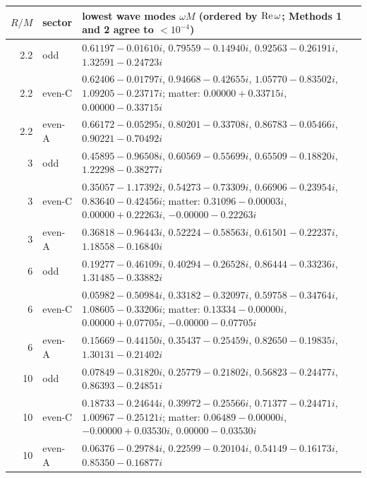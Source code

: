 \begin{tabular}{rlp{12cm}}\toprule
$R/M$ & sector & lowest wave modes $\omega M$ (ordered by ${\rm Re}\,\omega$; Methods 1 and 2 agree to $<10^{-4}$)\\\midrule
2.2 & odd & $0.61197-0.01610i$, $0.79559-0.14940i$, $0.92563-0.26191i$, $1.32591-0.24723i$ \\
2.2 & even-C & $0.62406-0.01797i$, $0.94668-0.42655i$, $1.05770-0.83502i$, $1.09205-0.23717i$; matter: $0.00000+0.33715i$, $0.00000-0.33715i$ \\
2.2 & even-A & $0.66172-0.05295i$, $0.80201-0.33708i$, $0.86783-0.05466i$, $0.90221-0.70492i$ \\
3 & odd & $0.45895-0.96508i$, $0.60569-0.55699i$, $0.65509-0.18820i$, $1.22298-0.38277i$ \\
3 & even-C & $0.35057-1.17392i$, $0.54273-0.73309i$, $0.66906-0.23954i$, $0.83640-0.42456i$; matter: $0.31096-0.00003i$, $0.00000+0.22263i$, $-0.00000-0.22263i$ \\
3 & even-A & $0.36818-0.96443i$, $0.52224-0.58563i$, $0.61501-0.22237i$, $1.18558-0.16840i$ \\
6 & odd & $0.19277-0.46109i$, $0.40294-0.26528i$, $0.86444-0.33236i$, $1.31485-0.33882i$ \\
6 & even-C & $0.05982-0.50984i$, $0.33182-0.32097i$, $0.59758-0.34764i$, $1.08605-0.33206i$; matter: $0.13334-0.00000i$, $0.00000+0.07705i$, $-0.00000-0.07705i$ \\
6 & even-A & $0.15669-0.44150i$, $0.35437-0.25459i$, $0.82650-0.19835i$, $1.30131-0.21402i$ \\
10 & odd & $0.07849-0.31820i$, $0.25779-0.21802i$, $0.56823-0.24477i$, $0.86393-0.24851i$ \\
10 & even-C & $0.18733-0.24644i$, $0.39972-0.25566i$, $0.71377-0.24471i$, $1.00967-0.25121i$; matter: $0.06489-0.00000i$, $-0.00000+0.03530i$, $0.00000-0.03530i$ \\
10 & even-A & $0.06376-0.29784i$, $0.22599-0.20104i$, $0.54149-0.16173i$, $0.85350-0.16877i$ \\
\bottomrule\end{tabular}
